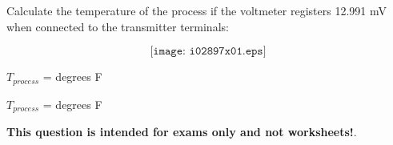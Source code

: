 

Calculate the temperature of the process if the voltmeter registers 12.991 mV when connected to the transmitter terminals:

$$\texttt{[image: i02897x01.eps]}$$

$T_{process}$ = \underbar{\hskip 50pt} degrees F







$T_{process}$ =  degrees F
 






{\bf This question is intended for exams only and not worksheets!}.



